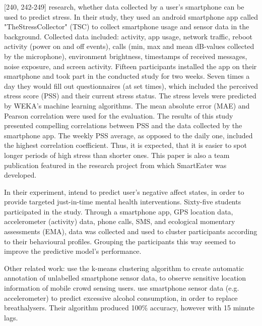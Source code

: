 \textcite{SmartphoneBasedStressPrediction2015}[240, 242-249] research, whether data collected by a user's smartphone can be used to predict stress. In their study, they used an android smartphone app called "TheStressCollector" (TSC) to collect smartphone usage and sensor data in the background. Collected data included: activity, app usage, network traffic, reboot activity (power on and off events), calls (min, max and mean dB-values collected by the microphone), environment brightness, timestamps of received messages, noise exposure, and screen activity. Fifteen participants installed the app on their smartphone and took part in the conducted study for two weeks. Seven times a day they would fill out questionnaires (at set times), which included the perceived stress score (PSS) and their current stress status. The stress levels were predicted by WEKA's machine learning algorithms. The mean absolute error (MAE) and Pearson correlation were used for the evaluation. The results of this study presented compelling correlations between PSS and the data collected by the smartphone app. The weekly PSS average, as opposed to the daily one, included the highest correlation coefficient. Thus, it is expected, that it is easier to spot longer periods of high stress than shorter ones. This paper is also a team publication featured in the research project from which SmartEater was developed.

In their experiment, \textcite{ClusterPassivelySensedData2018} intend to predict user's negative affect states, in order to provide targeted just-in-time mental health interventions. Sixty-five students participated in the study. Through a smartphone app, GPS location data, accelerometer (activity) data, phone calls, SMS, and ecological momentary assessments (EMA), data was collected and used to cluster participants according to their behavioural profiles. Grouping the participants this way seemed to improve the predictive model's performance.


Other related work: 
\textcite{pius2018automatic} use the k-means clustering algorithm to create automatic annotation of unlabelled smartphone sensor data, to observe sensitive location information of mobile crowd sensing users. \textcite{alcoholCravingPrediction} use smartphone sensor data (e.g. accelerometer) to predict excessive alcohol consumption, in order to replace breathalysers. Their algorithm produced 100\% accuracy, however with 15 minute lags.







